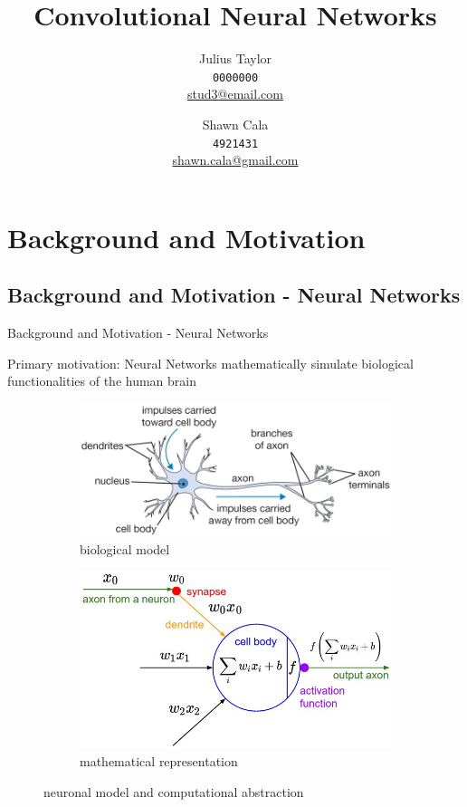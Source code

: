 \documentclass[12pt]{beamer}
\title{Convolutional Neural Networks}
\author{
\linebreak
Julius Taylor \\ \texttt{0000000} \\ \href{mailto:stud3@email.com}{stud3@email.com}
 \and   
 \linebreak
Shawn Cala \\ \texttt{4921431} \\ \href{mailto:shawn.cala@gmail.com}{shawn.cala@gmail.com}
}
\begin{document}
\begin{frame}
\titlepage
\end{frame}
\section{Background and Motivation}
\subsection{Background and Motivation - Neural Networks}
\begin{frame}{Background and Motivation - Neural Networks}

Primary motivation: Neural Networks mathematically simulate biological functionalities of the human brain
\begin{figure}
\begin{subfigure}{.5\textwidth}
  \centering
  \includegraphics[width=\linewidth,height=0.35\textheight]{images/neuron.png}
  \caption{biological model}
  \label{fig:sub1}
\end{subfigure}%
\begin{subfigure}{.5\textwidth}
  \centering
  \includegraphics[width=\linewidth,height=0.35\textheight]{images/neuron_model.jpeg}
  \caption{mathematical representation}
  \label{fig:sub2}
\end{subfigure}
\caption{neuronal model and computational abstraction}
\label{fig:abstract}
\end{figure}

\end{frame}
\end{document}
